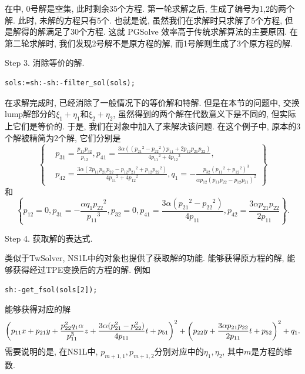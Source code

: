 在中, 0号解是空集, 此时剩余35个方程. 第一轮求解之后, 生成了编号为1,2的两个解. 此时, 未解的方程只有5个. 也就是说, 虽然我们在求解时只求解了5个方程, 但是解得的解满足了30个方程. 这就 PGSolve 效率高于传统求解算法的主要原因. 在第二轮求解时, 我们发现2号解不是原方程的解, 而1号解则生成了3个原方程的解. 

Step 3. 消除等价的解.
\begin{verbatim}
sols:=sh:-sh:-filter_sol(sols);
\end{verbatim}
在求解完成时, 已经消除了一般情况下的等价解和特解. 但是在本节的问题中, 交换lump解部分的$\xi_1+\eta_1$和$\xi_2+\eta_2$, 虽然得到的两个解在代数意义下是不同的, 但实际上它们是等价的. 于是, 我们在对象中加入了来解决该问题. 在这个例子中, 原本的3个解被精简为2个解, 它们分别是
\begin{equation}
\left\{ 
\begin{split}
&p_{{31}}={\frac {p_{{11}}p_{{32}}}{p_{{12}}}}, 
p_{{41}}={\frac {3\alpha \left(  \left( {p_{{21}}}^{2}-{p_{{22}}}^{2} \right) p_{{11}}+2p_{{12}}p_{{21}}p_{{22}} \right) }{4{p_{{11}}}^{2}+4{p_{{12}}}^{2}}}, \\ 
&p_{{42}}={\frac {3\alpha \left( 2p_{{11}}p_{{21}}p_{{22}}-p_{{12}}{p_{{21}}}^{2}+p_{{12}}{p_{{22}}}^{2}\right) }{4{p_{{11}}}^{2}+4{p_{{12}}}^{2}}}, 
q_{{1}}=-{\frac {p_{{32}} \left( {p_{{11}}}^{2}+{p_{{12}}}^{2} \right) ^{3}}{\alpha p_{{12}} \left( p_{{11}}p_{{22}}-p_{{12}}p_{{21}} \right) ^{2}}}
\end{split}
\right\}  \label{0S1L-1}
\end{equation}
和
\begin{equation}
 \left\{ p_{{12}}=0,p_{{31}}=-{\frac {\alpha q_{{1}}{p_{{22}}}^{2}
}{{p_{{11}}}^{3}}},p_{{32}}=0,p_{{41}}={\frac {3\alpha
 \left( {p_{{21}}}^{2}-{p_{{22}}}^{2} \right) }{4p_{{11}}}},p_{{42}
}={\frac {3\alpha p_{{21}}p_{{22}}}{2p_{{11}}}} \right\} . \label{0S1L-2}
\end{equation}

Step 4. 获取解的表达式.

类似于TwSolver, NS1L中的对象也提供了获取解的功能. 能够获得原方程的解, 能够获得经过TPE变换后的方程的解. 例如
\begin{verbatim}
sh:-get_fsol(sols[2]);
\end{verbatim}
能够获得对应的解 
\begin{equation}
\left(p_{11}x+p_{21}y+\frac{p_{22}^2q_1\alpha}{p_{11}^3}z+\frac{3\alpha (p_{21}^2-p_{22}^2)}{4p_{11}}t+p_{51}\right)^2
+\left(p_{22}y+\frac{3\alpha p_{21}p_{22}}{2p_{11}}t+p_{52}\right)^2+q_1 .
\end{equation}
需要说明的是, 在NS1L中, $p_{m+1,1},p_{m+1,2}$分别对应中的$\eta_1,\eta_2$, 其中$m$是方程的维数. 

